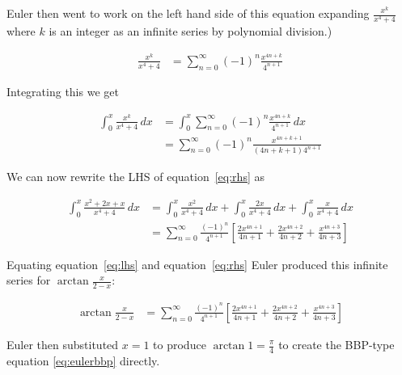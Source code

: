 \documentclass[11pt]{article}
\begin{document}



Euler then went to work on the left hand side of this equation expanding $\frac{x^k}{x^4 + 4}$ where $k$ is an integer as an infinite series by polynomial division.)

\begin{align}
  \frac{x^k}{x^4 + 4}
  &= \sum_{n = 0}^\infty (-1)^n \frac{x^{4n+k}}{4^{n+1}}
\end{align}

Integrating this we get

\begin{align}
  \int_0^x \frac{x^k}{x^4 + 4} \, dx
  &= \int_0^x \sum_{n = 0}^\infty (-1)^n \frac{x^{4n+k}}{4^{n+1}} \, dx \\
  &= \sum_{n = 0}^\infty (-1)^n \frac{x^{4n+k+1}}{(4n+k+1)4^{n+1}}
\end{align}

We can now rewrite the LHS of equation~\eqref{eq:rhs} as

\begin{align}
  \int_0^x \frac{x^2 + 2x + x}{x^4 + 4} \,dx
  &= \int_0^x \frac{x^2}{x^4 + 4} \,dx
    + \int_0^x \frac{2x}{x^4 + 4} \,dx
    + \int_0^x \frac{x}{x^4 + 4} \,dx \\
  &= \sum_{n = 0}^\infty \frac{(-1)^n}{4^{n+1}} \left[ \label{eq:lhs}
    \frac{2x^{4n+1}}{4n+1}
    + \frac{2x^{4n+2}}{4n+2}
    + \frac{x^{4n+3}}{4n+3}
  \right]
\end{align}

Equating equation~\eqref{eq:lhs} and equation~\eqref{eq:rhs} Euler produced this infinite series for $\arctan{\frac{x}{2-x}}$:

\begin{align} \label{eq:arctanseries}
  \arctan{\frac{x}{2-x}}
  &= \sum_{n = 0}^\infty \frac{(-1)^n}{4^{n+1}} \left[
    \frac{2x^{4n+1}}{4n+1}
    + \frac{2x^{4n+2}}{4n+2}
    + \frac{x^{4n+3}}{4n+3}
  \right]
\end{align}

Euler then substituted $x = 1$ to produce $\arctan{1} = \frac{\pi}{4}$ to create the BBP-type equation \eqref{eq:eulerbbp} directly.
\end{document}
